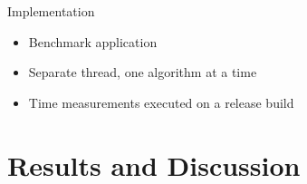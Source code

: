 \documentclass[xcolor={table}]{beamer}
\begin{document}
\begin{frame}{Implementation}
    \begin{itemize}
        \item Benchmark application
        \item Separate thread, one algorithm at a time
        \item Time measurements executed on a release build
    \end{itemize}
\end{frame}

\section{Results and Discussion}
\end{document}
